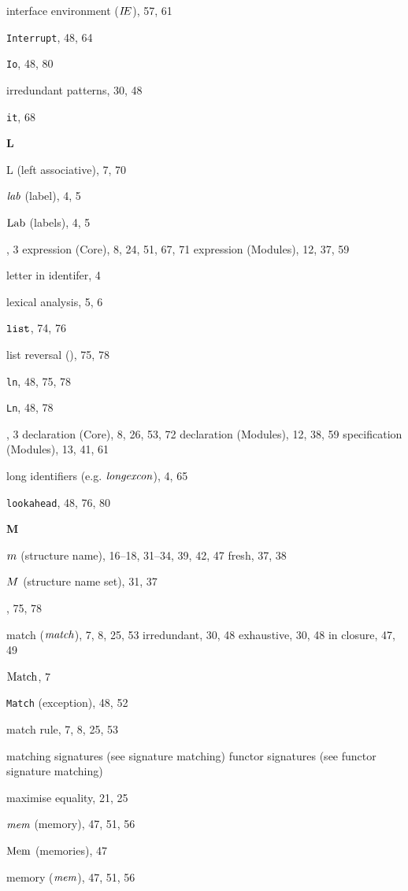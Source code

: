 \begin{theindex}
\item interface environment ($\mbox{$I\!E$}$), 57, 61
\item {\tt Interrupt}, 48, 64
\item {\tt Io}, 48, 80
\item irredundant patterns, 30, 48
\item {\tt it}, 68
\indexspace
\parbox{65mm}{\hfil{\large\bf L}\hfil}
\indexspace
\item L (left associative), 7, 70
\item ${\it lab}$ (label), 4, 5
\item ${\rm Lab}$ (labels), 4, 5
\item \LET, 3
\subitem expression (Core), 8, 24, 51, 67, 71
\subitem expression (Modules), 12, 37, 59
\item letter in identifer, 4
\item lexical analysis, 5, 6
\item $\mbox{\tt list}$, 74, 76
\item list reversal (), 75, 78
\item {\tt ln}, 48, 75, 78
\item {\tt Ln}, 48, 78
\item \LOCAL, 3
\subitem declaration (Core), 8, 26, 53, 72
\subitem declaration (Modules), 12, 38, 59
\subitem specification (Modules), 13, 41, 61
\item long identifiers (e.g. ${\it longexcon}$), 4, 65
\item {\tt lookahead}, 48, 76, 80
\indexspace
\parbox{65mm}{\hfil{\large\bf M}\hfil}
\indexspace
\item $m$ (structure name), 16--18, 31--34, 39, 42, 47
\subitem fresh, 37, 38
\item $M$ (structure name set), 31, 37
\item {}, 75, 78
\item match (${\it match}$), 7, 8, 25, 53
\subitem irredundant, 30, 48
\subitem exhaustive, 30, 48
\subitem in closure, 47, 49
\item ${\rm Match}$, 7
\item {\tt Match} (exception), 48, 52
\item match rule, 7, 8, 25, 53
\item matching 
\subitem signatures (see signature matching) 
\subitem functor signatures (see functor signature matching) 
\item maximise equality, 21, 25
\item $\mbox{\it mem}$ (memory), 47, 51, 56
\item ${\rm Mem}$ (memories), 47
\item memory ($\mbox{\it mem}$), 47, 51, 56

\end{theindex}
